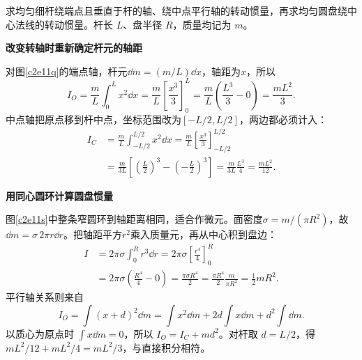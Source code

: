 \begin{question}
\begin{example}[杆与圆盘的转动惯量]
求均匀细杆绕端点且垂直于杆的轴、绕中点平行轴的转动惯量，再求均匀圆盘绕中心法线的转动惯量。杆长 $L$、盘半径 $R$，质量均记为 $m$。
\end{example}
\end{question}
\begin{solution}\textbf{改变转轴时重新确定杆元的轴距}\par\nobreak
对图\ref{c2e11q}的端点轴，杆元$\dd m=(m/L)\dd x$，轴距为$x$，所以
\[
I_O=\frac mL\int_0^L x^2\dd x
=\frac mL\left[\frac{x^3}{3}\right]_0^L
=\frac mL\left(\frac{L^3}{3}-0\right)=\frac{mL^2}{3}.
\]
中点轴把原点移到杆中点，坐标范围改为$[-L/2,L/2]$，两边都必须计入：
\begin{align*}
I_C&=\frac mL\int_{-L/2}^{L/2}x^2\dd x
=\frac mL\left[\frac{x^3}{3}\right]_{-L/2}^{L/2}\\
&=\frac m{3L}\left[\left(\frac L2\right)^3
 -\left(-\frac L2\right)^3\right]
=\frac m{3L}\frac{L^3}{4}=\frac{mL^2}{12}.
\end{align*}



\par\medskip{}\noindent\textbf{用同心圆环计算圆盘惯量}\par\nobreak
图\ref{c2e11s}中整条窄圆环到轴距离相同，适合作微元。面密度$\sigma=m/(\pi R^2)$，故$\dd m=\sigma\,2\pi r\dd r$。把轴距平方$r^2$乘入质量元，再从中心积到盘边：
\begin{align*}
I&=2\pi\sigma\int_0^Rr^3\dd r
=2\pi\sigma\left[\frac{r^4}{4}\right]_0^R\\
&=2\pi\sigma\left(\frac{R^4}{4}-0\right)
=\frac{\pi\sigma R^4}{2}
=\frac{\pi R^4}{2}\frac{m}{\pi R^2}
=\boxed{\frac12mR^2}.
\end{align*}
平行轴关系则来自
\[
 I_O=\int(x+d)^2\dd m
 =\int x^2\dd m+2d\int x\dd m+d^2\int\dd m.
\]
以质心为原点时 $\int x\dd m=0$，所以 $I_O=I_C+md^2$。对杆取 $d=L/2$，得 $mL^2/12+mL^2/4=mL^2/3$，与直接积分相符。
\end{solution}
